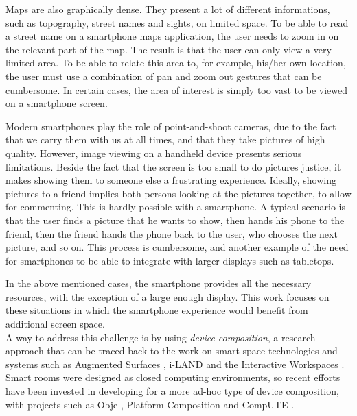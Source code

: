 Maps are also graphically dense.
They present a lot of different informations, such as topography, street names and sights, on limited space.
To be able to read a street name on a smartphone maps application, the user needs to zoom in on the relevant part of the map.
The result is that the user can only view a very limited area.
To be able to relate this area to, for example, his/her own location, the user must use a combination of pan and zoom out gestures that can be cumbersome.
In certain cases, the area of interest is simply too vast to be viewed on a smartphone screen.

Modern smartphones play the role of point-and-shoot cameras, due to the fact that we carry them with us at all times, and that they take pictures of high quality.
However, image viewing on a handheld device presents serious limitations.
Beside the fact that the screen is too small to do pictures justice, it makes showing them to someone else a frustrating experience.
Ideally, showing pictures to a friend implies both persons looking at the pictures together, to allow for commenting.
This is hardly possible with a smartphone.
A typical scenario is that the user finds a picture that he wants to show, then hands his phone to the friend, then the friend hands the phone back to the user, who chooses the next picture, and so on.
This process is cumbersome, and another example of the need for smartphones to be able to integrate with larger displays such as tabletops.

In the above mentioned cases, the smartphone provides all the necessary resources, with the exception of a large enough display.
This work focuses on these situations in which the smartphone experience would benefit from additional screen space.
\\
\linebreak
A way to address this challenge is by using \emph{device composition}, a research approach that can be traced back to the work on smart space technologies and systems such as Augmented Surfaces \citep{Rekimoto:1999:augmentedsurfaces}, \mbox{i-LAND} \citep{Streitz:1999:iland} and the Interactive Workspaces \citep{Johanson:2002:iroom}.
Smart rooms were designed as closed computing environments, so recent efforts have been invested in developing for a more ad-hoc type of device composition, with projects such as Obje \citep{Edwards:2009:obje}, Platform Composition \citep{Pering:2009:platformcomp} and CompUTE \citep{Bardram:2010:compute}.

